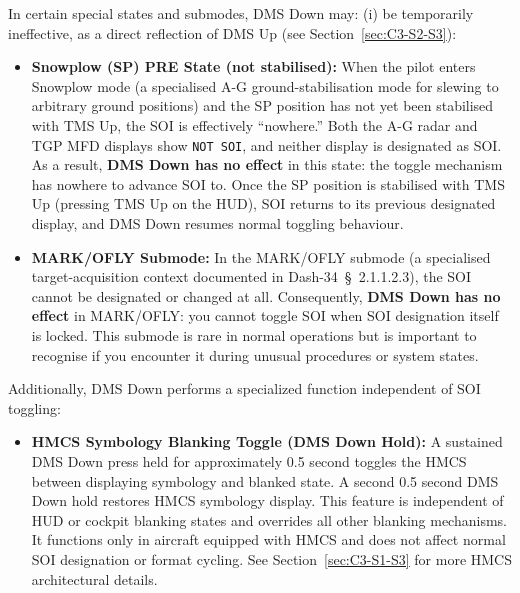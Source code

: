 \documentclass[11pt, a4paper, twoside]{report}
\providecommand{\dashref}[1]{Dash-34~\S~#1}
\begin{document}
In certain special states and submodes, DMS Down may: (i) be temporarily ineffective, as a direct reflection of DMS Up (see Section~\ref{sec:C3-S2-S3}):

\begin{itemize}
	\item \textbf{Snowplow (SP) PRE State (not stabilised):} When the pilot enters Snowplow mode (a specialised A-G ground-stabilisation mode for slewing to arbitrary ground positions) and the SP position has not yet been stabilised with TMS Up, the SOI is effectively ``nowhere.'' Both the A-G radar and TGP MFD displays show \texttt{NOT SOI}, and neither display is designated as SOI. As a result, \textbf{DMS Down has no effect} in this state: the toggle mechanism has nowhere to advance SOI to. Once the SP position is stabilised with TMS Up (pressing TMS Up on the HUD), SOI returns to its previous designated display, and DMS Down resumes normal toggling behaviour.
	
	\item \textbf{MARK/OFLY Submode:} In the MARK/OFLY submode (a specialised target-acquisition context documented in \dashref{2.1.1.2.3}), the SOI cannot be designated or changed at all. Consequently, \textbf{DMS Down has no effect} in MARK/OFLY: you cannot toggle SOI when SOI designation itself is locked. This submode is rare in normal operations but is important to recognise if you encounter it during unusual procedures or system states.
\end{itemize}

Additionally, DMS Down performs a specialized function independent of SOI toggling:

\begin{itemize}
	\item \textbf{HMCS Symbology Blanking Toggle (DMS Down Hold):} 
	A sustained DMS Down press held for approximately 0.5 second toggles the HMCS between displaying symbology and blanked state. A second 0.5 second DMS Down hold restores HMCS symbology display. This feature is independent of HUD or cockpit blanking states and overrides all other blanking mechanisms. It functions only in aircraft equipped with HMCS and does not affect normal SOI designation or format cycling. See Section~\ref{sec:C3-S1-S3} for more HMCS architectural details.
\end{itemize}

\end{document}
